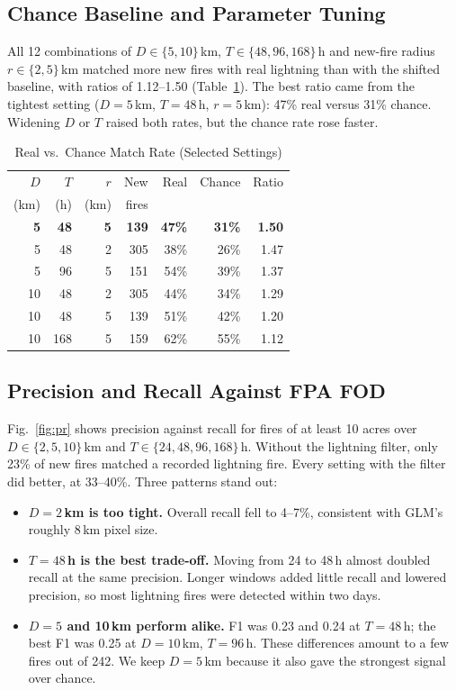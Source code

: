 \documentclass[10pt,journal,compsoc]{IEEEtran}
\begin{document}
\subsection{Chance Baseline and Parameter Tuning}\label{sec:tuning}
All 12 combinations of $D \in \{5, 10\}$\,km, $T \in \{48, 96, 168\}$\,h and new-fire radius $r \in \{2, 5\}$\,km matched more new fires with real lightning than with the shifted baseline, with ratios of 1.12--1.50 (Table~\ref{tab:tuning}). The best ratio came from the tightest setting ($D = 5$\,km, $T = 48$\,h, $r = 5$\,km): 47\% real versus 31\% chance. Widening $D$ or $T$ raised both rates, but the chance rate rose faster.

\begin{table}[!t]
\caption{Real vs.\ Chance Match Rate (Selected Settings)}
\label{tab:tuning}
\centering
\small
\begin{tabular}{@{}rrrrrrr@{}}
\toprule
$D$ & $T$ & $r$ & New & Real & Chance & Ratio \\
(km) & (h) & (km) & fires & & & \\
\midrule
\textbf{5} & \textbf{48} & \textbf{5} & \textbf{139} & \textbf{47\%} & \textbf{31\%} & \textbf{1.50} \\
5 & 48 & 2 & 305 & 38\% & 26\% & 1.47 \\
5 & 96 & 5 & 151 & 54\% & 39\% & 1.37 \\
10 & 48 & 2 & 305 & 44\% & 34\% & 1.29 \\
10 & 48 & 5 & 139 & 51\% & 42\% & 1.20 \\
10 & 168 & 5 & 159 & 62\% & 55\% & 1.12 \\
\bottomrule
\end{tabular}
\end{table}

\subsection{Precision and Recall Against FPA FOD}
Fig.~\ref{fig:pr} shows precision against recall for fires of at least 10 acres over $D \in \{2, 5, 10\}$\,km and $T \in \{24, 48, 96, 168\}$\,h. Without the lightning filter, only 23\% of new fires matched a recorded lightning fire. Every setting with the filter did better, at 33--40\%. Three patterns stand out:
\begin{itemize}
\item \textbf{$D = 2$\,km is too tight.} Overall recall fell to 4--7\%, consistent with GLM's roughly 8\,km pixel size.
\item \textbf{$T = 48$\,h is the best trade-off.} Moving from 24 to 48\,h almost doubled recall at the same precision. Longer windows added little recall and lowered precision, so most lightning fires were detected within two days.
\item \textbf{$D = 5$ and 10\,km perform alike.} F1 was 0.23 and 0.24 at $T = 48$\,h; the best F1 was 0.25 at $D = 10$\,km, $T = 96$\,h. These differences amount to a few fires out of 242. We keep $D = 5$\,km because it also gave the strongest signal over chance.
\end{itemize}
\end{document}

